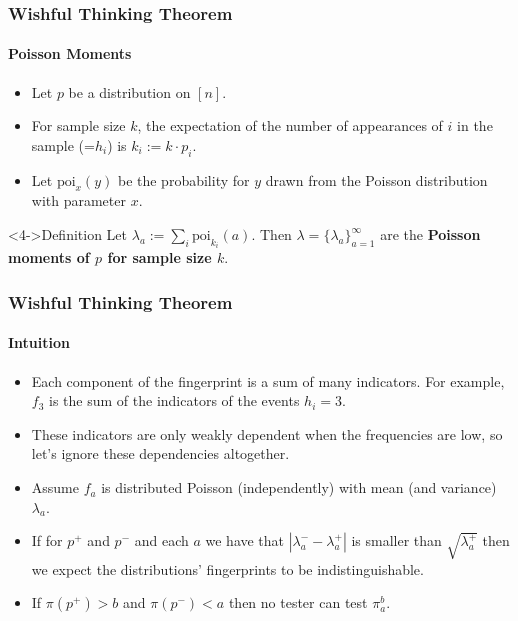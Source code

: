 \documentclass[handout]{beamer}
\begin{document}
\begin{frame}
  \frametitle{Wishful Thinking Theorem} \framesubtitle{Poisson
    Moments}

  \begin{block}{}
    
    \begin{itemize}
    \item<1-> Let $p$ be a distribution on $[n]$.
    \item<2-> For sample size $k$, the expectation of the number of
      appearances of $i$ in the sample (=$h_i$) is $k_i:=k\cdot p_i$.
    \item<3-> Let $\mbox{poi}_x(y)$ be the probability for $y$ drawn
      from the Poisson distribution with parameter $x$.
    \end{itemize}
  \end{block}
  \begin{block}<4->{Definition} Let
    $\lambda_a:=\sum_i\mbox{poi}_{k_i}(a)$. Then
    $\lambda=\{\lambda_a\}_{a=1}^\infty$ are the {\bf Poisson moments
      of $p$ for sample size $k$}.
  \end{block}
\end{frame}



\begin{frame}
  \frametitle{Wishful Thinking Theorem} \framesubtitle{Intuition}

  \begin{block}{}
    \begin{itemize}
    \item<1-> Each component of the fingerprint is a sum of many
      indicators. For example, $f_3$ is the sum of the indicators of
      the events $h_i=3$.
    \item<2-> These indicators are only weakly dependent when the
      frequencies are low, so let's ignore these dependencies
      altogether.
    \item<3-> Assume $f_a$ is distributed Poisson (independently) with mean
      (and variance) $\lambda_a$.
    \item<4-> If for $p^+$ and $p^-$ and each $a$ we have that
      $|\lambda^-_a-\lambda^+_a|$ is smaller than $\sqrt{\lambda^+_a}$
      then we expect the distributions' fingerprints to be
      indistinguishable.
    \item<5-> If $\pi(p^+)>b$ and $\pi(p^-)<a$ then no tester can test
      $\pi_a^b$.
    \end{itemize}
  \end{block}
\end{frame}
\end{document}
